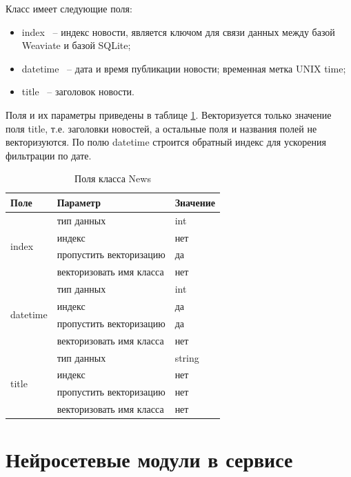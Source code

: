 Класс имеет следующие поля:
\begin{itemize}
    \item index ~-- индекс новости, является ключом для связи данных между базой Weaviate и базой SQLite;
    \item datetime ~-- дата и время публикации новости; временная метка UNIX time;
    \item title ~-- заголовок новости.
\end{itemize}

Поля и их параметры приведены в таблице \ref{tab:class-news-props}. Векторизуется только значение поля title, т.е. заголовки новостей, а остальные поля и названия полей не векторизуются. По полю datetime строится обратный индекс для ускорения фильтрации по дате.

\begin{table}[ht]
    \caption{Поля класса News}
    \label{tab:class-news-props}
    \begin{tabularx}{\textwidth}{|l|X|X|}
        \hline
        Поле & Параметр & Значение \\
        \hline
        \multirow{4}{*}{index} & тип данных & int \\
            \cline{2-3}
            & индекс & нет \\
            \cline{2-3}
            & пропустить векторизацию & да \\
            \cline{2-3}
            & векторизовать имя класса & нет \\
        \hline
        \multirow{4}{*}{datetime} & тип данных & int \\
            \cline{2-3}
            & индекс & да \\
            \cline{2-3}
            & пропустить векторизацию & да \\
            \cline{2-3}
            & векторизовать имя класса & нет \\
        \hline
        \multirow{4}{*}{title} & тип данных & string \\
            \cline{2-3}
            & индекс & нет \\
            \cline{2-3}
            & пропустить векторизацию & нет \\
            \cline{2-3}
            & векторизовать имя класса & нет \\
        \hline
    \end{tabularx}
\end{table}

\section{Нейросетевые модули в сервисе}

